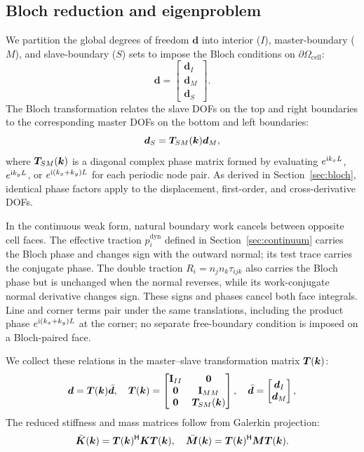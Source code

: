\subsection{Bloch reduction and eigenproblem}
We partition the global degrees of freedom $\bm{d}$ into interior ($I$), master-boundary ($M$), and slave-boundary ($S$) sets to impose the Bloch conditions on $\partial\Omega_{\mathrm{cell}}$:
\begin{equation}
\bm{d} = \begin{bmatrix} \bm{d}_I \\ \bm{d}_M \\ \bm{d}_S \end{bmatrix}.
\label{eq:d_partition}
\end{equation}
The Bloch transformation relates the slave DOFs on the top and right boundaries to the corresponding master DOFs on the bottom and left boundaries:
\begin{equation}
\bm{d}_S = \bm{T}_{SM}(\bm{k}) \bm{d}_M,
\label{eq:slave_master_rel}
\end{equation}
where $\bm{T}_{SM}(\bm{k})$ is a diagonal complex phase matrix formed by evaluating $e^{\mathrm{i} k_x L}$, $e^{\mathrm{i} k_y L}$, or $e^{\mathrm{i} (k_x + k_y)L}$ for each periodic node pair. As derived in Section~\ref{sec:bloch}, identical phase factors apply to the displacement, first-order, and cross-derivative DOFs.

In the continuous weak form, natural boundary work cancels between opposite cell faces. The effective traction $p_i^{\mathrm{dyn}}$ defined in Section~\ref{sec:continuum} carries the Bloch phase and changes sign with the outward normal; its test trace carries the conjugate phase. The double traction $R_i=n_jn_k\tau_{ijk}$ also carries the Bloch phase but is unchanged when the normal reverses, while its work-conjugate normal derivative changes sign. These signs and phases cancel both face integrals. Line and corner terms pair under the same translations, including the product phase $e^{\mathrm{i}(k_x+k_y)L}$ at the corner; no separate free-boundary condition is imposed on a Bloch-paired face.

We collect these relations in the master--slave transformation matrix $\bm{T}(\bm{k})$:
\begin{equation}
\bm{d} = \bm{T}(\bm{k}) \bar{\bm{d}}, \quad \bm{T}(\bm{k}) = \begin{bmatrix} \mathbf{I}_{II} & \mathbf{0} \\ \mathbf{0} & \mathbf{I}_{MM} \\ \mathbf{0} & \bm{T}_{SM}(\bm{k}) \end{bmatrix}, \quad \bar{\bm{d}} = \begin{bmatrix} \bm{d}_I \\ \bm{d}_M \end{bmatrix},
\label{eq:T_bloch}
\end{equation}
The reduced stiffness and mass matrices follow from Galerkin projection:
\begin{equation}
\bar{\bm{K}}(\bm{k}) = \bm{T}(\bm{k})^\mathsf{H} \bm{K} \bm{T}(\bm{k}), \quad \bar{\bm{M}}(\bm{k}) = \bm{T}(\bm{k})^\mathsf{H} \bm{M} \bm{T}(\bm{k}).
\label{eq:reduced_KM}
\end{equation}

